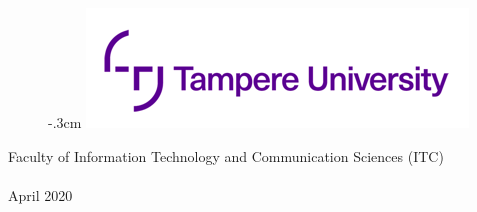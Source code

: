 

\hypersetup{pdfstartview=}



\makeatletter


%
\thispagestyle{empty}
\vspace*{-.5cm}\noindent

\begin{figure}
    \vspace{-1.3cm}
    \advance\leftskip-.3cm
    \noindent\includegraphics{doc/tunilogo.png}
\end{figure}
 
\vspace{2.5cm}
\begin{flushright}
\noindent\textsf{\LARGE{\@author}}

\noindent\vspace{0.5cm}

\noindent\Huge{\textsf{\textbf{\textcolor{tunipurple}{\@title}}}}
\end{flushright}
\vspace{11.7cm} %

\begin{flushright}  
    \begin{spacing}{1.0}
        \textsf{Faculty of Information Technology and Communication Sciences (ITC)\\
        \@thesistype\\
        April 2020}
    \end{spacing}
\end{flushright}



